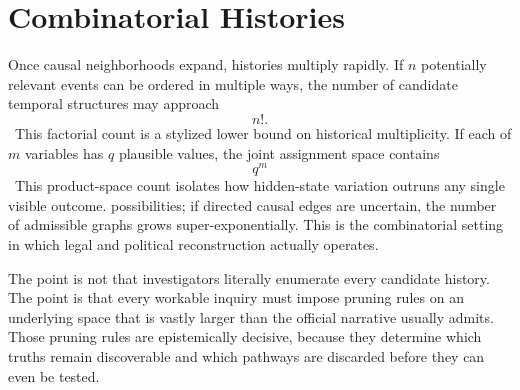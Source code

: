 
\chapter{Combinatorial Histories}
\label{ch:ch012}

Once causal neighborhoods expand, histories multiply rapidly. If \(n\) potentially relevant events can be ordered in multiple ways, the number of candidate temporal structures may approach
\[
n!.
\]
\ToyModel\ This factorial count is a stylized lower bound on historical multiplicity.
If each of \(m\) variables has \(q\) plausible values, the joint assignment space contains
\[
q^m
\]
\ToyModel\ This product-space count isolates how hidden-state variation outruns any single visible outcome.
possibilities; if directed causal edges are uncertain, the number of admissible graphs grows super-exponentially. This is the combinatorial setting in which legal and political reconstruction actually operates.

The point is not that investigators literally enumerate every candidate history. The point is that every workable inquiry must impose pruning rules on an underlying space that is vastly larger than the official narrative usually admits. Those pruning rules are epistemically decisive, because they determine which truths remain discoverable and which pathways are discarded before they can even be tested.

